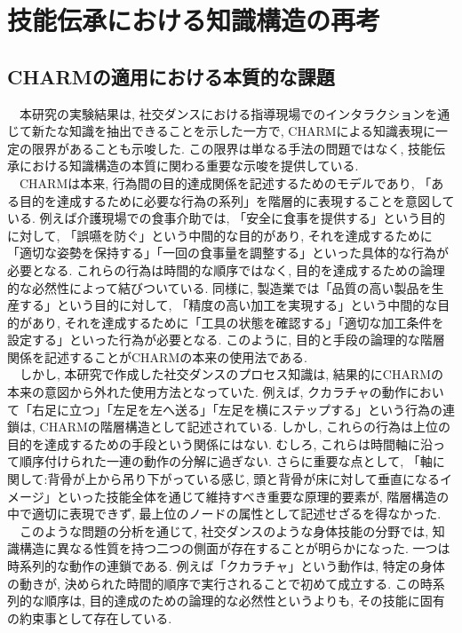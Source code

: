 \section{技能伝承における知識構造の再考}
\subsection{CHARMの適用における本質的な課題}
　本研究の実験結果は, 社交ダンスにおける指導現場でのインタラクションを通じて新たな知識を抽出できることを示した一方で, CHARMによる知識表現に一定の限界があることも示唆した. この限界は単なる手法の問題ではなく, 技能伝承における知識構造の本質に関わる重要な示唆を提供している. \\
　CHARMは本来, 行為間の目的達成関係を記述するためのモデルであり, 「ある目的を達成するために必要な行為の系列」を階層的に表現することを意図している. 例えば介護現場での食事介助では, 「安全に食事を提供する」という目的に対して, 「誤嚥を防ぐ」という中間的な目的があり, それを達成するために「適切な姿勢を保持する」「一回の食事量を調整する」といった具体的な行為が必要となる. これらの行為は時間的な順序ではなく, 目的を達成するための論理的な必然性によって結びついている. 同様に, 製造業では「品質の高い製品を生産する」という目的に対して, 「精度の高い加工を実現する」という中間的な目的があり, それを達成するために「工具の状態を確認する」「適切な加工条件を設定する」といった行為が必要となる. このように, 目的と手段の論理的な階層関係を記述することがCHARMの本来の使用法である. \\
　しかし, 本研究で作成した社交ダンスのプロセス知識は, 結果的にCHARMの本来の意図から外れた使用方法となっていた. 例えば, クカラチャの動作において「右足に立つ」「左足を左へ送る」「左足を横にステップする」という行為の連鎖は, CHARMの階層構造として記述されている. しかし, これらの行為は上位の目的を達成するための手段という関係にはない. むしろ, これらは時間軸に沿って順序付けられた一連の動作の分解に過ぎない. さらに重要な点として, 「軸に関して:背骨が上から吊り下がっている感じ, 頭と背骨が床に対して垂直になるイメージ」といった技能全体を通じて維持すべき重要な原理的要素が, 階層構造の中で適切に表現できず, 最上位のノードの属性として記述せざるを得なかった. \\
　このような問題の分析を通じて, 社交ダンスのような身体技能の分野では, 知識構造に異なる性質を持つ二つの側面が存在することが明らかになった. 一つは時系列的な動作の連鎖である. 例えば「クカラチャ」という動作は, 特定の身体の動きが, 決められた時間的順序で実行されることで初めて成立する. この時系列的な順序は, 目的達成のための論理的な必然性というよりも, その技能に固有の約束事として存在している. \\
